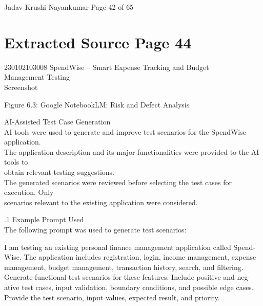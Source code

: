 \documentclass[12pt,a4paper]{report}
\begin{document}
\smallskip
Jadav Krushi Nayankumar                                                        Page 42 of 65\\ 

\clearpage
\section*{Extracted Source Page 44}
230102103008                        SpendWise – Smart Expense Tracking and Budget\\ 
Management Testing\\ 

\smallskip
Screenshot\\ 

\smallskip

\smallskip

\smallskip

\smallskip
Figure 6.3: Google NotebookLM: Risk and Defect Analysis\\ 

\smallskip

\smallskip

 AI-Assisted Test Case Generation\\ 

\smallskip
AI tools were used to generate and improve test scenarios for the SpendWise application.\\ 
The application description and its major functionalities were provided to the AI tools to\\ 
obtain relevant testing suggestions.\\ 
The generated scenarios were reviewed before selecting the test cases for execution. Only\\ 
scenarios relevant to the existing application were considered.\\ 

\smallskip

.1 Example Prompt Used\\ 

\smallskip
The following prompt was used to generate test scenarios:\\ 

\smallskip

\smallskip
I am testing an existing personal finance management application called Spend-\\ 
Wise. The application includes registration, login, income management, expense\\ 
management, budget management, transaction history, search, and filtering.\\ 
Generate functional test scenarios for these features. Include positive and neg-\\ 
ative test cases, input validation, boundary conditions, and possible edge cases.\\ 
Provide the test scenario, input values, expected result, and priority.\\ 
\end{document}
